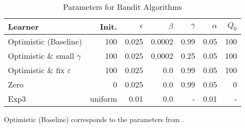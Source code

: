 \begin{table}[h]
    \caption{Parameters for Bandit Algorithms}
    \begin{center}
    \begin{tabular}{ l r r r r r r }
    	\toprule
        Learner & Init. & $\epsilon$ & $\beta$ &  $\gamma$ & $\alpha$ & $Q_0$\\
        \midrule
        Optimistic (Baseline) & 100 & 0.025 & 0.0002 & 0.99 & 0.05 & 100 \\
        Optimistic \& small $\gamma$ & 100 & 0.025 & 0.0002 & 0.25 & 0.05 & 100\\
        Optimistic \& fix $\varepsilon$ & 100 & 0.025 & 0.0 & 0.99 & 0.05 & 100 \\
        Zero & 0 & 0.025 & 0.0 & 0.99 & 0.05 & 0\\
        \midrule
        Exp3 &  uniform & 0.01 & 0.0 & - & 0.01 & - \\
        \bottomrule
	\end{tabular}
	\label{tab:param_compl_info}
	\footnotesize \vspace{1ex}
	
    Optimistic (Baseline) corresponds to the parameters from \citet{banchio2022artificial}.
	\end{center}
\end{table}